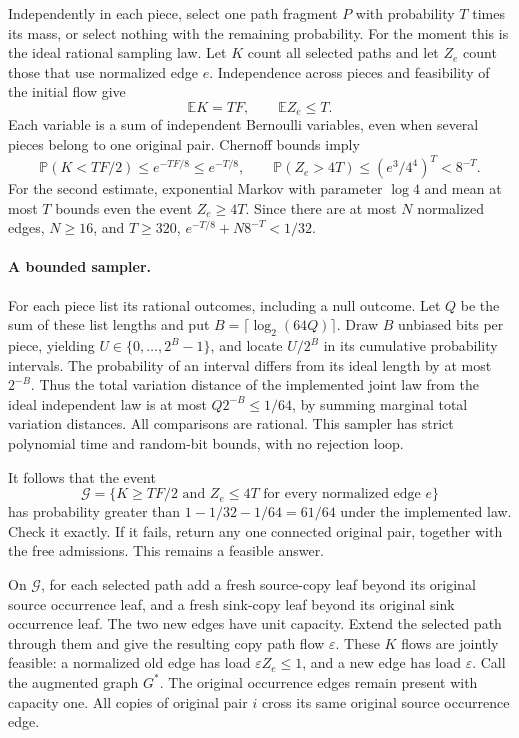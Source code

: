 \documentclass[acmsmall,11pt,screen,nonacm]{acmart}
\newcommand{\E}{\mathbb{E}}
\newcommand{\Prb}{\mathbb{P}}
\begin{document}
Independently in each piece, select one path fragment $P$ with probability
$T$ times its mass, or select nothing with the remaining probability.
For the moment this is the ideal rational sampling law. Let $K$ count all
selected paths and let $Z_e$ count those that use normalized edge $e$.
Independence across pieces and feasibility of the initial flow give
\begin{equation}\label{eq:means}
 \E K=TF,\qquad \E Z_e\le T.
\end{equation}
Each variable is a sum of independent Bernoulli variables, even when several
pieces belong to one original pair. Chernoff bounds imply
\begin{equation}\label{eq:chernoff}
 \Prb(K<TF/2)\le e^{-TF/8}\le e^{-T/8},\qquad
 \Prb(Z_e>4T)\le(e^3/4^4)^T<8^{-T}.
\end{equation}
For the second estimate, exponential Markov with parameter $\log4$ and
mean at most $T$ bounds even the event $Z_e\ge4T$. Since there are at most
$N$ normalized edges, $N\ge16$, and $T\ge320$,
$e^{-T/8}+N8^{-T}<1/32$.

\paragraph{A bounded sampler.}
For each piece list its rational outcomes, including a null outcome. Let
$Q$ be the sum of these list lengths and put
$B=\lceil\log_2(64Q)\rceil$. Draw $B$ unbiased bits per piece, yielding
$U\in\{0,\ldots,2^B-1\}$, and locate $U/2^B$ in its cumulative probability
intervals. The probability of an interval differs from its ideal length
by at most $2^{-B}$. Thus the total variation distance of the implemented
joint law from the ideal independent law is at most
$Q2^{-B}\le1/64$, by summing marginal total variation distances.
All comparisons are rational. This sampler has strict polynomial time and
random-bit bounds, with no rejection loop.

It follows that the event
\begin{equation}\label{eq:good}
 \mathcal G=\{K\ge TF/2\text{ and }Z_e\le4T\text{ for every normalized edge }e\}
\end{equation}
has probability greater than $1-1/32-1/64=61/64$ under the implemented law.
Check it exactly. If it fails, return any one connected original pair,
together with the free admissions. This remains a feasible answer.

On $\mathcal G$, for each selected path add a fresh source-copy leaf beyond
its original source occurrence leaf, and a fresh sink-copy leaf beyond its
original sink occurrence leaf. The two new edges have unit capacity. Extend
the selected path through them and give the resulting copy path flow
$\varepsilon$. These $K$ flows are jointly feasible: a normalized old edge
has load $\varepsilon Z_e\le1$, and a new edge has load $\varepsilon$.
Call the augmented graph $G^*$. The original occurrence edges remain present
with capacity one. All copies of original pair $i$ cross its same original
source occurrence edge.
\end{document}
